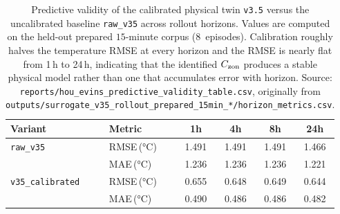 \begin{table}[t]
  \centering
  \caption{Predictive validity of the calibrated physical twin \texttt{v3.5} versus the uncalibrated baseline \texttt{raw\_v35} across rollout horizons. Values are computed on the held-out prepared $15$-minute corpus (8~episodes). Calibration roughly halves the temperature RMSE at every horizon and the RMSE is nearly flat from 1\,h to 24\,h, indicating that the identified $C_{\mathrm{zon}}$ produces a stable physical model rather than one that accumulates error with horizon. Source: \texttt{reports/hou\_evins\_predictive\_validity\_table.csv}, originally from \texttt{outputs/surrogate\_v35\_rollout\_prepared\_15min\_*/horizon\_metrics.csv}.}
  \label{tab:predictive}
  \begin{tabular}{llcccc}
    \toprule
    Variant & Metric & 1h & 4h & 8h & 24h \\
    \midrule
    \texttt{raw\_v35} & RMSE\,(\si{\celsius}) & 1.491 & 1.491 & 1.491 & 1.466 \\
     & MAE\,(\si{\celsius}) & 1.236 & 1.236 & 1.236 & 1.221 \\
    \midrule
    \texttt{v35\_calibrated} & RMSE\,(\si{\celsius}) & 0.655 & 0.648 & 0.649 & 0.644 \\
     & MAE\,(\si{\celsius}) & 0.490 & 0.486 & 0.486 & 0.482 \\
    \bottomrule
  \end{tabular}
\end{table}
